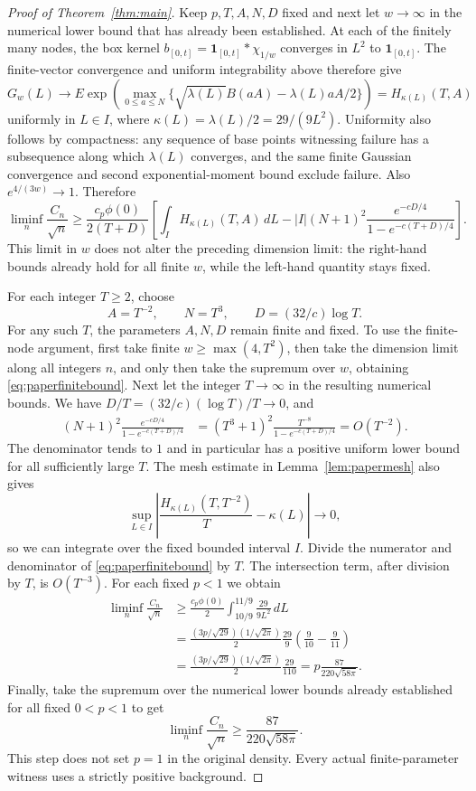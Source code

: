 \documentclass[a4paper,11pt]{article}
\theoremstyle{remark}
\begin{document}
\begin{proof}[Proof of Theorem~\ref{thm:main}]
Keep $p,T,A,N,D$ fixed and next let
$w\to\infty$ in the numerical lower bound that has already been established. At each of the finitely many nodes, the box kernel
$b_{[0,t]}=\mathbf1_{[0,t]}*\chi_{1/w}$ converges in $L^2$ to
$\mathbf1_{[0,t]}$. The finite-vector convergence and uniform integrability above therefore give
\[
 G_w(L)\longrightarrow
 E\exp\!\left(\max_{0\le a\le N}
 \{\sqrt{\lambda(L)}B(aA)-\lambda(L)aA/2\}\right)
 =H_{\kappa(L)}(T,A)
\]
uniformly in $L\in I$, where
$\kappa(L)=\lambda(L)/2=29/(9L^2)$.
Uniformity also follows by compactness: any sequence of base points witnessing failure has a subsequence along which
$\lambda(L)$ converges, and the same finite Gaussian convergence and second exponential-moment bound exclude failure.
Also $e^{4/(3w)}\to1$. Therefore
\begin{equation}\label{eq:paperfinitebound}
 \liminf_n\frac{C_n}{\sqrt n}\ge
 \frac{c_p\phi(0)}{2(T+D)}
 \left[\int_I H_{\kappa(L)}(T,A)\,dL
 -|I|(N+1)^2\frac{e^{-cD/4}}{1-e^{-c(T+D)/4}}\right].
\end{equation}
This limit in $w$ does not alter the preceding dimension limit: the right-hand bounds already hold for all finite
$w$, while the left-hand quantity stays fixed.

For each integer $T\ge2$, choose
\[
 A=T^{-2},\qquad N=T^3,\qquad D=(32/c)\log T.
\]
For any such $T$, the parameters $A,N,D$ remain finite and fixed. To use the finite-node argument,
first take finite $w\ge\max(4,T^2)$, then take the dimension limit along all integers $n$,
and only then take the supremum over $w$, obtaining \eqref{eq:paperfinitebound}.
Next let the integer $T\to\infty$ in the resulting numerical bounds. We have
$D/T=(32/c)(\log T)/T\to0$, and
\begin{align*}
 (N+1)^2\frac{e^{-cD/4}}{1-e^{-c(T+D)/4}}
 &=(T^3+1)^2\frac{T^{-8}}{1-e^{-c(T+D)/4}}
 =O(T^{-2}).
\end{align*}
The denominator tends to $1$ and in particular has a positive uniform lower bound for all sufficiently large $T$.
The mesh estimate in Lemma~\ref{lem:papermesh} also gives
\[
 \sup_{L\in I}\left|\frac{H_{\kappa(L)}(T,T^{-2})}T-\kappa(L)\right|
 \longrightarrow0,
\]
so we can integrate over the fixed bounded interval $I$.
Divide the numerator and denominator of \eqref{eq:paperfinitebound} by $T$. The intersection term, after division by
$T$, is $O(T^{-3})$. For each fixed $p<1$ we obtain
\begin{align*}
 \liminf_n\frac{C_n}{\sqrt n}
 &\ge\frac{c_p\phi(0)}2\int_{10/9}^{11/9}\frac{29}{9L^2}\,dL\\
 &=\frac{(3p/\sqrt{29})(1/\sqrt{2\pi})}{2}
 \frac{29}{9}\left(\frac9{10}-\frac9{11}\right)\\
 &=\frac{(3p/\sqrt{29})(1/\sqrt{2\pi})}{2}\frac{29}{110}
 =p\frac{87}{220\sqrt{58\pi}}.
\end{align*}
Finally, take the supremum over the numerical lower bounds already established for all fixed $0<p<1$ to get
\[
 \liminf_n\frac{C_n}{\sqrt n}\ge\frac{87}{220\sqrt{58\pi}}.
\]
This step does not set $p=1$ in the original density. Every actual finite-parameter witness uses a strictly positive background.
\end{proof}
\end{document}
